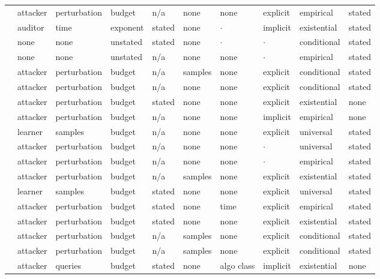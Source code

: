 \begin{landscape}
\begin{longtable}{rlllllllll}
\cite{MZME19} & attacker & perturbation & budget & n/a & none & none & explicit & empirical & stated \\
\cite{BGGKRR25} & auditor & time & exponent & stated & none & $\cdot$ & implicit & existential & stated \\
\cite{GCSGWVBHMB25} & none & none & unstated & stated & none & $\cdot$ & $\cdot$ & conditional & stated \\
\cite{FTHMLD25} & none & none & unstated & n/a & none & none & $\cdot$ & empirical & stated \\
\cite{DMM19} & attacker & perturbation & budget & n/a & samples & none & explicit & conditional & stated \\
\cite{CYDS26} & attacker & perturbation & budget & n/a & none & none & explicit & conditional & stated \\
\cite{ACW18} & attacker & perturbation & budget & stated & none & none & explicit & existential & none \\
\cite{CAPBRTGMK19} & attacker & perturbation & budget & n/a & none & none & implicit & empirical & none \\
\cite{CBM18} & learner & samples & budget & n/a & none & none & explicit & universal & stated \\
\cite{WK18} & attacker & perturbation & budget & n/a & none & none & $\cdot$ & universal & stated \\
\cite{SYLZZRB19} & attacker & perturbation & budget & n/a & none & none & $\cdot$ & empirical & stated \\
\cite{SSTTM18} & attacker & perturbation & budget & n/a & samples & none & explicit & existential & stated \\
\cite{MHS22} & learner & samples & budget & stated & none & none & explicit & universal & stated \\
\cite{CASDFCMH21} & attacker & perturbation & budget & stated & none & time & explicit & empirical & stated \\
\cite{TSETM19} & attacker & perturbation & budget & stated & none & none & explicit & existential & stated \\
\cite{HDDH25} & attacker & perturbation & budget & n/a & samples & none & explicit & conditional & stated \\
\cite{SWKBC25} & attacker & perturbation & budget & n/a & samples & none & explicit & conditional & stated \\
\cite{FK24} & attacker & queries & budget & stated & none & algo class & implicit & existential & none \\

\end{longtable}
\end{landscape}
